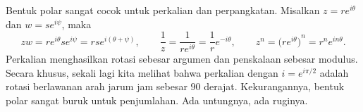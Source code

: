 
Bentuk polar sangat cocok untuk perkalian dan perpangkatan.
Misalkan $z = r e^{i\theta}$ dan $w = s e^{i \psi}$, maka
\begin{equation*}
zw =
r e^{i \theta} s e^{i \psi} =
rs e^{i (\theta+ \psi)},
\qquad
\frac{1}{z} =
\frac{1}{r e^{i \theta}} =
\frac{1}{r} e^{-i \theta} ,
\qquad
z^n =
{\bigl(r e^{i \theta}\bigr)}^n =
r^n e^{i n\theta} .
\end{equation*}
Perkalian menghasilkan rotasi sebesar argumen dan penskalaan sebesar modulus.
Secara khusus, sekali lagi kita melihat bahwa perkalian dengan $i = e^{i \pi / 2}$ adalah
rotasi berlawanan arah jarum jam sebesar $90$ derajat.
Kekurangannya, bentuk polar sangat buruk untuk penjumlahan.
Ada untungnya, ada ruginya.
